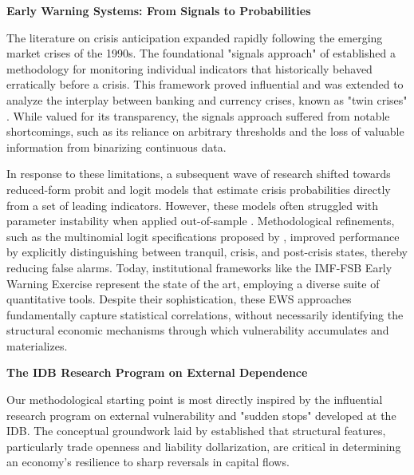 \documentclass[12pt,a4paper]{article}
\numberwithin{equation}{section}
\theoremstyle{definition}
\theoremstyle{remark}
\begin{document}
\textbf{Early Warning Systems: From Signals to Probabilities}

The literature on crisis anticipation expanded rapidly following the emerging market crises of the 1990s. The foundational "signals approach" of \textcite{kaminsky1998leading} established a methodology for monitoring individual indicators that historically behaved erratically before a crisis. This framework proved influential and was extended to analyze the interplay between banking and currency crises, known as "twin crises" \parencite{kaminsky1999twin, goldstein2000assessing}. While valued for its transparency, the signals approach suffered from notable shortcomings, such as its reliance on arbitrary thresholds and the loss of valuable information from binarizing continuous data.

In response to these limitations, a subsequent wave of research shifted towards reduced-form probit and logit models that estimate crisis probabilities directly from a set of leading indicators. However, these models often struggled with parameter instability when applied out-of-sample \parencite{berg2004assessing}. Methodological refinements, such as the multinomial logit specifications proposed by \textcite{bussiere2006towards}, improved performance by explicitly distinguishing between tranquil, crisis, and post-crisis states, thereby reducing false alarms. Today, institutional frameworks like the IMF-FSB Early Warning Exercise \parencite{imf2010ews} represent the state of the art, employing a diverse suite of quantitative tools. Despite their sophistication, these EWS approaches fundamentally capture statistical correlations, without necessarily identifying the structural economic mechanisms through which vulnerability accumulates and materializes.

\textbf{The IDB Research Program on External Dependence}

Our methodological starting point is most directly inspired by the influential research program on external vulnerability and "sudden stops" developed at the IDB. The conceptual groundwork laid by \textcite{calvo2003sudden, calvo2005sudden} established that structural features, particularly trade openness and liability dollarization, are critical in determining an economy's resilience to sharp reversals in capital flows.
\end{document}
